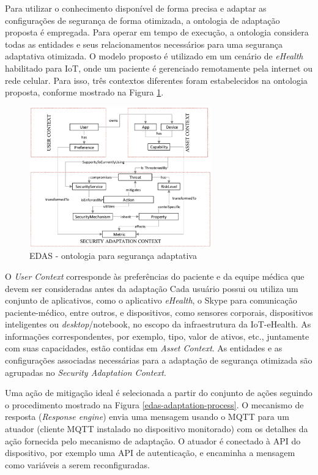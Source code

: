 \documentclass[tid,table]{texufpel} %
\begin{document}
Para utilizar o conhecimento disponível de forma precisa e adaptar as configurações de segurança de forma otimizada, a ontologia de adaptação proposta é empregada. Para operar em tempo de execução, a ontologia considera todas as entidades e seus relacionamentos necessários para uma segurança adaptativa otimizada. O modelo proposto é utilizado em um cenário de \textit{eHealth} habilitado para IoT, onde um paciente é gerenciado remotamente pela internet ou rede celular. Para isso, três contextos diferentes foram estabelecidos na ontologia proposta, conforme mostrado na Figura \ref{edas-ontology}.

\begin{figure}[ht]
\centering
\includegraphics[width=0.7\textwidth]{imagens/edas-ontology.png}
\caption{EDAS - ontologia para segurança adaptativa}
\label{edas-ontology}
\end{figure}


O \textit{User Context} corresponde às preferências do paciente e da equipe médica que devem ser consideradas antes da adaptação Cada usuário possui ou utiliza um conjunto de aplicativos, como o aplicativo \textit{eHealth}, o Skype para comunicação paciente-médico, entre outros, e dispositivos, como sensores corporais, dispositivos inteligentes ou \textit{desktop}/notebook, no escopo da infraestrutura da IoT-eHealth. As informações correspondentes, por exemplo, tipo, valor de ativos, etc., juntamente com suas capacidades, estão contidas em \textit{Asset Context}. As entidades e as configurações associadas necessárias para a adaptação de segurança otimizada são agrupadas no \textit{Security Adaptation Context}.

Uma ação de mitigação ideal é selecionada a partir do conjunto de ações seguindo o procedimento mostrado na Figura \ref{edas-adaptation-process}. O mecanismo de resposta (\textit{Response engine}) envia uma mensagem usando o MQTT para um atuador (cliente MQTT instalado no dispositivo monitorado) com os detalhes da ação fornecida pelo mecanismo de adaptação. O atuador é conectado à API do dispositivo, por exemplo uma API de autenticação, e encaminha a mensagem como variáveis a serem reconfiguradas.
\end{document}
